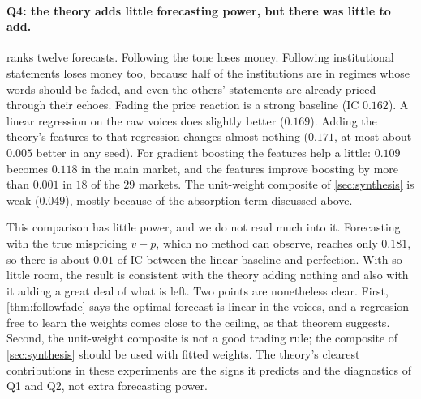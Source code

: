 \documentclass[11pt,a4paper]{article}
\theoremstyle{plain}
\theoremstyle{definition}
\theoremstyle{remark}
\begin{document}
\paragraph{Q4: the theory adds little forecasting power, but there was little to add.}  ranks twelve forecasts. Following the tone loses money. Following institutional statements loses money too, because half of the institutions are in regimes whose words should be faded, and even the others' statements are already priced through their echoes. Fading the price reaction is a strong baseline (IC $0.162$). A linear regression on the raw voices does slightly better ($0.169$). Adding the theory's features to that regression changes almost nothing ($0.171$, at most about $0.005$ better in any seed). For gradient boosting the features help a little: $0.109$ becomes $0.118$ in the main market, and the features improve boosting by more than $0.001$ in $18$ of the $29$ markets. The unit-weight composite of \cref{sec:synthesis} is weak ($0.049$), mostly because of the absorption term discussed above.

This comparison has little power, and we do not read much into it. Forecasting with the true mispricing $v-p$, which no method can observe, reaches only $0.181$, so there is about $0.01$ of IC between the linear baseline and perfection. With so little room, the result is consistent with the theory adding nothing and also with it adding a great deal of what is left. Two points are nonetheless clear. First, \cref{thm:followfade} says the optimal forecast is linear in the voices, and a regression free to learn the weights comes close to the ceiling, as that theorem suggests. Second, the unit-weight composite is not a good trading rule; the composite of \cref{sec:synthesis} should be used with fitted weights. The theory's clearest contributions in these experiments are the signs it predicts and the diagnostics of Q1 and Q2, not extra forecasting power.
\end{document}

